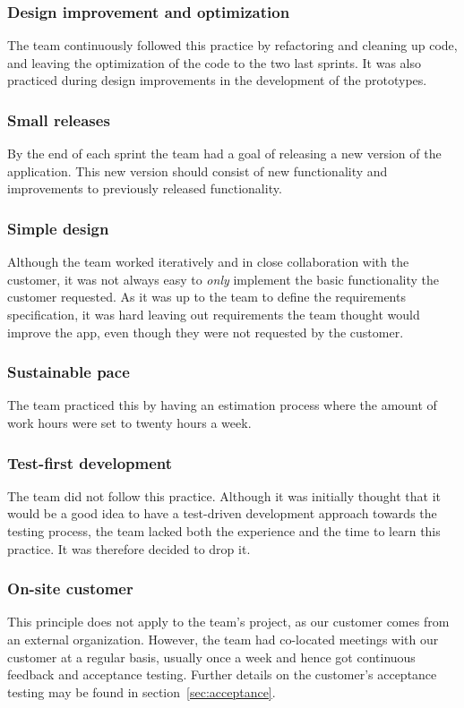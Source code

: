 \subsubsection{Design improvement and optimization}
The team continuously followed this practice by refactoring and cleaning up code, and leaving the optimization of the code to the two last sprints. It was also practiced during design improvements in the development of the prototypes.
 
\subsubsection{Small releases}
By the end of each sprint the team had a goal of releasing a new version of the application. This new version should consist of new functionality and improvements to previously released functionality.

\subsubsection{Simple design}
Although the team worked iteratively and in close collaboration with the customer, it was not always easy to \emph{only} implement the basic functionality the customer requested. As it was up to the team to define the requirements specification, it was hard leaving out requirements the team thought would improve the app, even though they were not requested by the customer.

\subsubsection{Sustainable pace}
The team practiced this by having an estimation process where the amount of work hours were set to twenty hours a week.

\subsubsection{Test-first development}
The team did not follow this practice. Although it was initially thought that it would be a good idea to have a test-driven development approach towards the testing process, the team lacked both the experience and the time to learn this practice. It was therefore decided to drop it.


\subsubsection{On-site customer}
This principle does not apply to the team's project, as our customer comes from an external organization. However, the team had co-located meetings with our customer at a regular basis, usually once a week and hence got continuous feedback and acceptance testing. Further details on the customer's acceptance testing may be found in section~\ref{sec:acceptance}.




